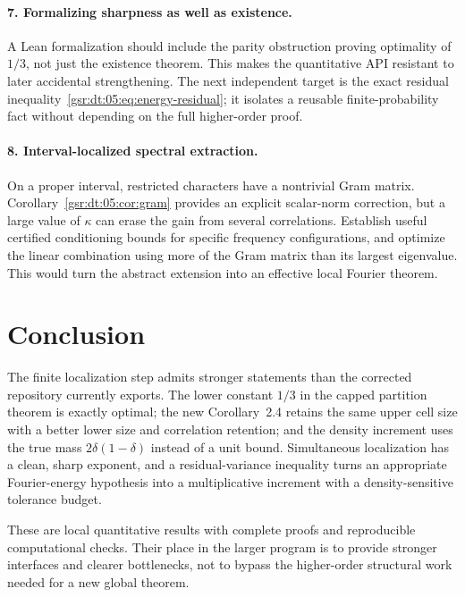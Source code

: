\documentclass[11pt,letterpaper]{article}
\numberwithin{equation}{section}
\theoremstyle{definition}
\theoremstyle{remark}
\newcommand{\1}{\mathbf 1}
\newcommand{\srctag}[1]{\texorpdfstring{\enspace\textup{[#1]}}{ [#1]}}
\newcommand{\srcnote}[2]{\par\noindent{\small\textit{Source #1, delivered #2.}}\par}
\begin{document}
\paragraph{7. Formalizing sharpness as well as existence.}
A Lean formalization should include the parity obstruction proving optimality of $1/3$, not just the existence theorem. This makes the quantitative API resistant to later accidental strengthening. The next independent target is the exact residual inequality~\eqref{gsr:dt:05:eq:energy-residual}; it isolates a reusable finite-probability fact without depending on the full higher-order proof.

\paragraph{8. Interval-localized spectral extraction.}
On a proper interval, restricted characters have a nontrivial Gram matrix. Corollary~\ref{gsr:dt:05:cor:gram} provides an explicit scalar-norm correction, but a large value of $\kappa$ can erase the gain from several correlations. Establish useful certified conditioning bounds for specific frequency configurations, and optimize the linear combination using more of the Gram matrix than its largest eigenvalue. This would turn the abstract extension into an effective local Fourier theorem.

\section[{Conclusion\srctag{05}}]{Conclusion}\label{gsr:fz:05:sec:d10}
\srcnote{05}{Section 10}
The finite localization step admits stronger statements than the corrected repository currently exports. The lower constant $1/3$ in the capped partition theorem is exactly optimal; the new Corollary~2.4 retains the same upper cell size with a better lower size and correlation retention; and the density increment uses the true mass $2\delta(1-\delta)$ instead of a unit bound. Simultaneous localization has a clean, sharp exponent, and a residual-variance inequality turns an appropriate Fourier-energy hypothesis into a multiplicative increment with a density-sensitive tolerance budget.

These are local quantitative results with complete proofs and reproducible computational checks. Their place in the larger program is to provide stronger interfaces and clearer bottlenecks, not to bypass the higher-order structural work needed for a new global theorem.
\end{document}
